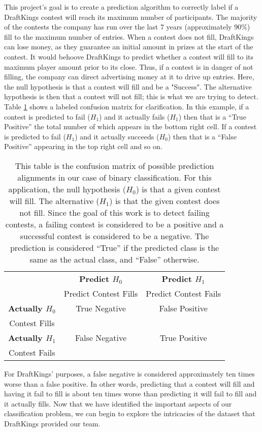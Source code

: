 This project's goal is to create a prediction algorithm to correctly label if a DraftKings contest will reach its maximum number of participants. The majority of the contests the company has run over the last 7 years (approximately $90\%$) fill to the maximum number of entries. When a contest does not fill, DraftKings can lose money, as they guarantee an initial amount in prizes at the start of the contest. It would behoove DraftKings to predict whether a contest will fill to its maximum player amount prior to its close. Thus, if a contest is in danger of not filling, the company can direct advertising money at it to drive up entries. Here, the null hypothesis is that a contest will fill and be a "Success". The alternative hypothesis is then that a contest will not fill; this is what we are trying to detect. Table \ref{tab:confmat} shows a labeled confusion matrix for clarification. In this example, if a contest is predicted to fail ($H_{1}$) and it actually fails ($H_{1}$) then that is a ``True Positive'' the total number of which appears in the bottom right cell. If a contest is predicted to fail ($H_{1}$) and it actually succeeds ($H_{0}$) then that is a ``False Positive'' appearing in the top right cell and so on.

\begin{table}
\centering
\begin{tabular}{| c | c | c |}
\hline
 & \textbf{Predict $H_{0}$} & \textbf{Predict $H_{1}$}  \\ 
 & Predict Contest Fills & Predict Contest Fails \\
\hline
\textbf{Actually $H_{0}$} & True Negative & False Positive  \\ 
Contest Fills & & \\
\hline
\textbf{Actually $H_{1}$} & False Negative & True Positive  \\
Contest Fails & & \\
\hline
\end{tabular}
\caption[Problem-Specific Confusion Matrix]{This table is the confusion matrix of possible prediction alignments in our case of binary classification. For this application, the null hypothesis ($H_{0}$) is that a given contest will fill. The alternative ($H_{1}$) is that the given contest does not fill. Since the goal of this work is to detect failing contests, a failing contest is considered to be a positive and a successful contest is considered to be a negative. The prediction is considered ``True'' if the predicted class is the same as the actual class, and ``False'' otherwise.}
\label{tab:confmat}
\end{table}

For DraftKings' purposes, a false negative is considered approximately ten times worse than a false positive. In other words, predicting that a contest will fill and having it fail to fill is about ten times worse than predicting it will fail to fill and it actually fills. Now that we have identified the important aspects of our classification problem, we can begin to explore the intricacies of the dataset that DraftKings provided our team. 
 